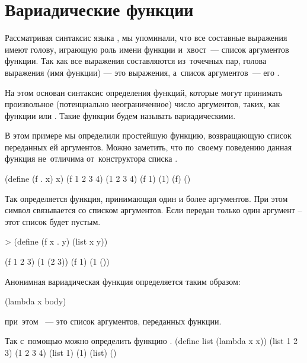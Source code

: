 \section{Вариадические функции}%
Рассматривая синтаксис языка \Scheme, мы упоминали, что все составные выражения имеют голову, играющую роль имени функции и~хвост~--- список аргументов функции. Так как все выражения \Scheme составляются из~точечных пар, голова выражения (имя функции) --- это  выражения, а~список аргументов~--- его .

На этом основан синтаксис определения функций, которые могут принимать произвольное (потенциально неограниченное) число аргументов, таких, как функции \s{+} или \s{-}. Такие функции будем называть вариадическими.

\begin{example}{%
В этом примере мы определили простейшую функцию, возвращающую список переданных ей аргументов. Можно заметить, что по~своему поведению данная функция не~отличима от~конструктора списка .}

\REPLin
  {(define (f . x) x)}
\REPL
  {(f 1 2 3 4)}
  {(1 2 3 4)}
\REPL
  {(f 1)}
  {(1)}
\REPL
  {(f)}
  {()}
\end{example}
\vspace{-\bigskipamount}
\begin{example}{%
Так определяется функция, принимающая один и более аргументов. При этом символ  связывается со списком аргументов. Если передан только один аргумент -- этот список будет пустым.}

\begin{ExampleCode}[emph={x,y}]
> (define (f x . y)
    (list x y))
\end{ExampleCode}
\REPL
  {(f 1 2 3)}
  {(1 (2 3))}
\REPL
  {(f 1)}
  {(1 ())}
\end{example}

Анонимная вариадическая функция определяется таким образом:
\begin{SchemeCode}[emph={x}]
        (lambda x body) %
\end{SchemeCode}
\noindent при~этом ~--- это список аргументов, переданных функции.

\begin{example}{%
Так с~помощью  можно определить функцию .}
\REPLin
  {(define list (lambda x x))}
\REPL
  {(list 1 2 3)}
  {(1 2 3 4)}
\REPL
  {(list 1)}
  {(1)}
\REPL
  {(list)}
  {()}
\end{example}

